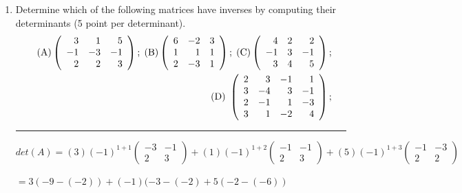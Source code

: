 \documentclass[fleqn]{article}
\begin{document}
\begin{enumerate}

  \item Determine which of the following matrices have inverses by computing their determinants (5 point per determinant).
    \begin{eqnarray*}
      &&\rm{(A) }\left( 
      \begin{array}{rrr}
      3 & 1 & 5 \\ 
      -1 & -3 & -1 \\ 
      2 & 2 & 3
      \end{array}
      \right) ;\;\rm{(B) }\left( 
      \begin{array}{rrr}
      6 & -2 & 3 \\ 
      1 & 1 & 1 \\ 
      2 & -3 & 1
      \end{array}
      \right) ;\;\rm{(C) }\left( 
      \begin{array}{rrr}
      4 & 2 & 2 \\ 
      -1 & 3 & -1 \\ 
      3 & 4 & 5
      \end{array}
      \right) ;\; \\
      &&\rm{(D)\ }\left( 
      \begin{array}{rrrr}
      2 & 3 & -1 & 1 \\ 
      3 & -4 & 3 & -1 \\ 
      2 & -1 & 1 & -3 \\ 
      3 & 1 & -2 & 4
      \end{array}
      \right) ;\;
    \end{eqnarray*}

    \rule{16cm}{0.4pt}

    $
      det(A)=
      (3)(-1)^{1+1}
      \begin{pmatrix}
        -3 & -1 \\ 
        2 & 3
      \end{pmatrix}
      +
      (1)(-1)^{1+2}
      \begin{pmatrix}
        -1 & -1 \\ 
        2 & 3
      \end{pmatrix}
      +
      (5)(-1)^{1+3}
      \begin{pmatrix}
        -1 & -3 \\ 
        2 & 2
      \end{pmatrix}
    $

    $
      = 3(-9-(-2))+(-1)(-3-(-2)+5(-2-(-6))
    $


\end{enumerate}
\end{document}
